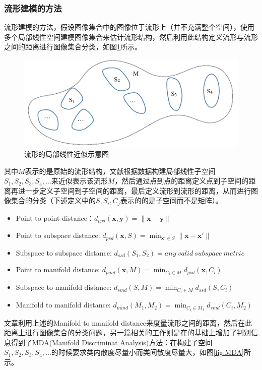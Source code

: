 \subsubsection{流形建模的方法}
\label{sec:current_SubMan_Manifold}
流形建模的方法\cite{Manifold_MMD}，\cite{Manifold_MDA}假设图像集合中的图像位于流形上（并不充满整个空间），使用多个局部线性空间建模图像集合来估计流形结构，然后利用此结构定义流形与流形之间的距离进行图像集合分类，如图\ref{fig:MMD}所示。
\begin{figure}[h]
	\centering
	\includegraphics[width=0.7\linewidth]{source/MMD.png}
	\caption{流形的局部线性近似示意图}
	\label{fig:MMD}
\end{figure}
其中$M$表示的是原始的流形结构，文献\cite{Manifold_MMD}根据数据构建局部线性子空间$S_1,S_2,S_3,S_4,...$来近似表示该流形$M$，然后通过点到点的距离定义点到子空间的距离再进一步定义子空间到子空间的距离，最后定义流形到流形的距离，从而进行图像集合的分类（下述定义中的$S,S_{i},C_{j}$表示的的是子空间而不是矩阵）。
\begin{itemize}
\item Point to point distance：$d_{ppd} (\bm{x},\bm{y})=\|\bm{x}-\bm{y}\|$
\item Point to subspace distance: $d_{psd} (\bm{x},S)=\min_{\bm{x}'\in S}\|\bm{x}-\bm{x}'\|$
\item Subspace to subspace distance: $d_{ssd} (S_1,S_2)= any~valid~subspace~metric$
\item Point to manifold distance: $d_{pmd} (\bm{x},M)=\min_{C_i\in M}d_{psd} (\bm{x},C_i )$
\item Subspace to manifold distance: $d_{smd} (S,M)=\min_{C_i\in M}d_{ssd} (S,C_i )$
\item Manifold to manifold distance: $d_{mmd} (M_1,M_2 )=\min_{C_i\in M_1}d_{smd} (C_i,M_2 )$
\end{itemize}
文章\cite{Manifold_MMD}利用上述的Manifold to manifold distance来度量流形之间的距离，然后在此距离上进行图像集合的分类问题，另一篇相关的工作\cite{Manifold_MDA}则是在\cite{Manifold_MMD}的基础上增加了判别信息得到了MDA(Manifold Discriminat Analysis)方法：在构建子空间$S_1,S_2,S_3,S_4,...$的时候要求类内散度尽量小而类间散度尽量大，如图\ref{fig:MDA}所示。
